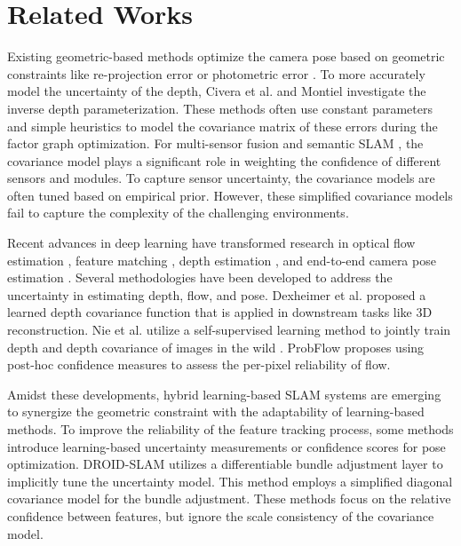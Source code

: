 \section{Related Works}

Existing geometric-based methods optimize the camera pose based on geometric constraints like re-projection error \cite{mur2015orb, klein2007parallel} or photometric error \cite{wang2017stereo, engel2014lsd, gao2018ldso}.
To more accurately model the uncertainty of the depth, Civera et al. \cite{Javier2008InverseDepth} and Montiel\cite{Montiel2006UnifiedInverseDepth} investigate the inverse depth parameterization.
These methods often use constant parameters and simple heuristics to model the covariance matrix of these errors during the factor graph optimization.
For multi-sensor fusion \cite{zhao2021super, qin2018vins} and semantic SLAM \cite{yang2019cubeslam, qiu2022airdos}, the covariance model plays a significant role in weighting the confidence of different sensors and modules.
To capture sensor uncertainty, the covariance models are often tuned based on empirical prior. 
However, these simplified covariance models fail to capture the complexity of the challenging environments.

Recent advances in deep learning have transformed research in optical flow estimation \cite{teed2020raft, parameshwara2022diffposenet}, feature matching \cite{sarlin2020superglue, wang2023dust3r}, depth estimation \cite{zhou2017unsupervised, li2018undeepvo, tateno2017cnn}, and end-to-end camera pose estimation \cite{costante2015exploring, tartanvo2020corl}.
Several methodologies have been developed to address the uncertainty in estimating depth, flow, and pose.
Dexheimer et al. \cite{Dexheimer_2023_learndepthcov} proposed a learned depth covariance function that is applied in downstream tasks like 3D reconstruction.
Nie et al. utilize a self-supervised learning method to jointly train depth and depth covariance of images in the wild \cite{Xinyu_2022_SelfImprovDepthEst}. 
ProbFlow \cite{Wannenwetsch_2017_ICCV} proposes using post-hoc confidence measures to assess the per-pixel reliability of flow.

Amidst these developments, hybrid learning-based SLAM systems \cite{yang2020d3vo, li2018undeepvo, fu2024islam, ranjan2019competitive, backtofeat2021, costante2020uncertainty} are emerging to synergize the geometric constraint with the adaptability of learning-based methods.
To improve the reliability of the feature tracking process, some methods introduce learning-based uncertainty measurements or confidence scores \cite{muhle2023learning, Kaygusuz_2021, wang2023dust3r, rabiee2020ivslam, murai2024mast3r} for pose optimization.
DROID-SLAM \cite{teed2021droid} utilizes a differentiable bundle adjustment layer to implicitly tune the uncertainty model. This method employs a simplified diagonal covariance model for the bundle adjustment.
These methods focus on the relative confidence between features, but ignore the scale consistency of the covariance model.


